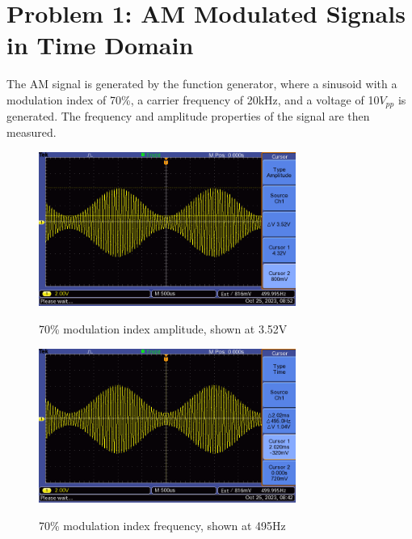 \section{Problem 1: AM Modulated Signals in Time Domain}
The AM signal is generated by the function generator, where a sinusoid with a modulation index of 70\%, a carrier frequency of 20kHz, and a voltage of 10$V_{pp}$ is generated. The frequency and amplitude properties of the signal are then measured.

\begin{figure}[H]
    \centering
    \includegraphics[width=0.75\textwidth]{images/execution_01_07_amp.png}
    \label{fig:execution_01_07_time}
    \caption{70\% modulation index amplitude, shown at 3.52V}
\end{figure}

\begin{figure}[H]
    \centering
    \includegraphics[width=0.75\textwidth]{images/execution_01_07_freq.png}
    \label{fig:execution_01_07_frequency}
    \caption{70\% modulation index frequency, shown at 495Hz}
\end{figure}

